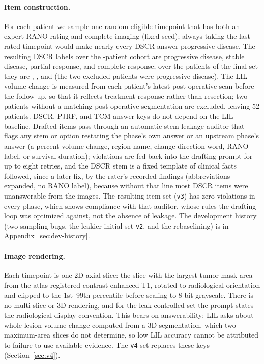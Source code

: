 \documentclass[11pt]{article}
\begin{document}
\paragraph{Item construction.} For each patient we sample one random eligible timepoint that has both an expert RANO rating and complete imaging (fixed seed); always taking the last rated timepoint would make nearly every DSCR answer progressive disease. The resulting DSCR labels over the \nPatFifty{}-patient cohort are \dscrFiftyPD{} progressive disease, \dscrFiftySD{} stable disease, \dscrFiftyPR{} partial response, and \dscrFiftyCR{} complete response; over the \nPatVthree{} patients of the final set they are \dscrVthreePD{}, \dscrVthreeSD{}, \dscrVthreePR{} and \dscrVthreeCR{} (the two excluded patients were progressive disease). The LIL volume change is measured from each patient's latest post-operative scan before the follow-up, so that it reflects treatment response rather than resection; two patients without a matching post-operative segmentation are excluded, leaving 52 patients. DSCR, PJRF, and TCM answer keys do not depend on the LIL baseline. Drafted items pass through an automatic stem-leakage auditor that flags any stem or option restating the phase's own answer or an upstream phase's answer (a percent volume change, region name, change-direction word, RANO label, or survival duration); violations are fed back into the drafting prompt for up to eight retries, and the DSCR stem is a fixed template of clinical facts followed, since a later fix, by the rater\textquoteright s recorded findings (abbreviations expanded, no RANO label), because without that line most DSCR items were unanswerable from the images. The resulting item set (\texttt{v3}) has zero violations in every phase, which shows compliance with that auditor, whose rules the drafting loop was optimized against, not the absence of leakage. The development history (two sampling bugs, the leakier initial set \texttt{v2}, and the rebaselining) is in Appendix~\ref{sec:dev-history}.

\paragraph{Image rendering.} Each timepoint is one 2D axial slice: the slice with the largest tumor-mask area from the atlas-registered contrast-enhanced T1, rotated to radiological orientation and clipped to the 1st--99th percentile before scaling to 8-bit grayscale. There is no multi-slice or 3D rendering, and for the leak-controlled set the prompt states the radiological display convention. This bears on answerability: LIL asks about whole-lesion volume change computed from a 3D segmentation, which two maximum-area slices do not determine, so low LIL accuracy cannot be attributed to failure to use available evidence. The \texttt{v4} set replaces these keys (Section~\ref{sec:v4}).
\end{document}
